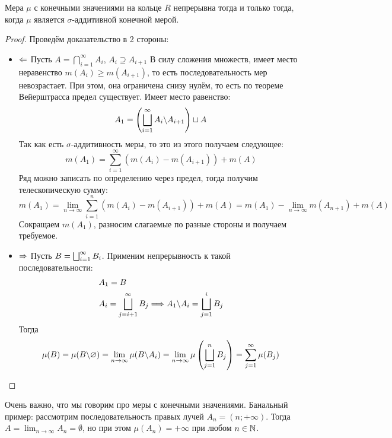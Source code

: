 \begin{theorem}
	Мера $\mu$ с конечными значениями на кольце $R$ непрерывна тогда и только тогда, когда $\mu$ является $\sigma$-аддитивной конечной мерой.
\end{theorem}

\begin{proof}
	Проведём доказательство в 2 стороны:
	\begin{itemize}
		\item $\Leftarrow$ Пусть $A = \bigcap_{i = 1}^\infty A_i$, $A_i \supseteq A_{i + 1}$ В силу сложения множеств, имеет место неравенство $m(A_i) \ge m(A_{i + 1})$, то есть последовательность мер невозрастает. При этом, она ограничена снизу нулём, то есть по теореме Вейерштрасса предел существует. Имеет место равенство:
		\[
			A_1 = \left(\bigsqcup_{i = 1}^\infty A_i \backslash A_{i + 1}\right) \sqcup A
		\]
		Так как есть $\sigma$-аддитивность меры, то это из этого получаем следующее:
		\[
			m(A_1) = \sum_{i = 1}^\infty (m(A_i) - m(A_{i + 1})) + m(A)
		\]
		Ряд можно записать по определению через предел, тогда получим телескопическую сумму:
		\[
			m(A_1) = \lim_{n \to \infty} \sum_{i = 1}^n (m(A_i) - m(A_{i + 1})) + m(A) = m(A_1) - \lim_{n \to \infty} m(A_{n + 1}) + m(A)
		\]
		Сокращаем $m(A_1)$, разносим слагаемые по разные стороны и получаем требуемое.
		
		\item $\Rightarrow$ Пусть $B = \bigsqcup_{i = 1}^\infty B_i$. Применим непрерывность к такой последовательности:
		\begin{align*}
			&{A_1 = B}
			\\
			&{A_i = \bigsqcup_{j = i + 1}^\infty B_j \Longrightarrow A_1 \backslash A_i = \bigsqcup_{j = 1}^i B_j}
		\end{align*}
		Тогда
		\[
			\mu(B) = \mu(B \backslash \varnothing) = \lim_{n \to \infty} \mu(B \backslash A_i) = \lim_{n \to \infty} \mu\left(\bigsqcup_{j = 1}^n B_j\right) = \sum_{j = 1}^\infty \mu(B_j)
		\]
	\end{itemize}
\end{proof}

\begin{note}
	Очень важно, что мы говорим про меры с конечными значениями. Банальный пример: рассмотрим последовательность правых лучей $A_n = (n; +\infty)$. Тогда $A = \lim_{n \to \infty} A_n = \emptyset$, но при этом $\mu(A_n) = +\infty$ при любом $n \in \mathbb{N}$.
\end{note}